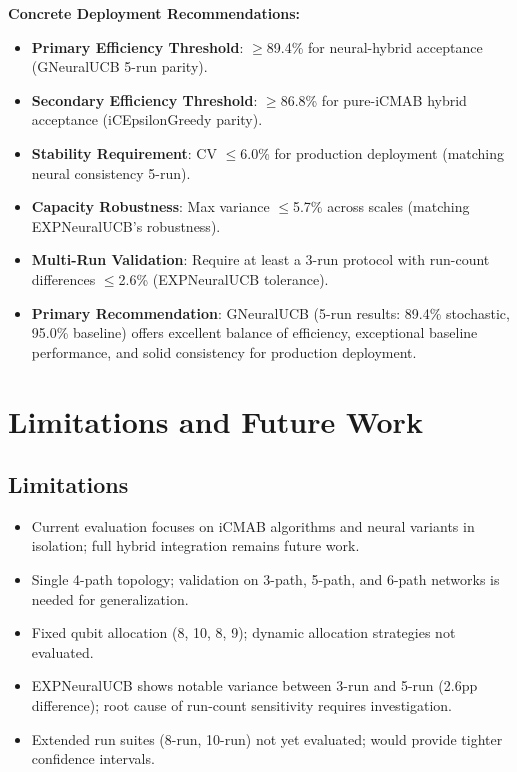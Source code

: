 \documentclass[12pt,a4paper]{article}
\begin{document}
\textbf{Concrete Deployment Recommendations:}
\begin{itemize}
\item \textbf{Primary Efficiency Threshold}: $\geq$89.4\% for neural-hybrid acceptance (GNeuralUCB 5-run parity).
\item \textbf{Secondary Efficiency Threshold}: $\geq$86.8\% for pure-iCMAB hybrid acceptance (iCEpsilonGreedy parity).
\item \textbf{Stability Requirement}: CV $\leq$6.0\% for production deployment (matching neural consistency 5-run).
\item \textbf{Capacity Robustness}: Max variance $\leq$5.7\% across scales (matching EXPNeuralUCB's robustness).
\item \textbf{Multi-Run Validation}: Require at least a 3-run protocol with run-count differences $\leq$2.6\% (EXPNeuralUCB tolerance).
\item \textbf{Primary Recommendation}: GNeuralUCB (5-run results: 89.4\% stochastic, 95.0\% baseline) offers excellent balance of efficiency, exceptional baseline performance, and solid consistency for production deployment.
\end{itemize}

\section{Limitations and Future Work}

\subsection{Limitations}
\begin{itemize}
\item Current evaluation focuses on iCMAB algorithms and neural variants in isolation; full hybrid integration remains future work.
\item Single 4-path topology; validation on 3-path, 5-path, and 6-path networks is needed for generalization.
\item Fixed qubit allocation (8, 10, 8, 9); dynamic allocation strategies not evaluated.
\item EXPNeuralUCB shows notable variance between 3-run and 5-run (2.6pp difference); root cause of run-count sensitivity requires investigation.
\item Extended run suites (8-run, 10-run) not yet evaluated; would provide tighter confidence intervals.
\end{itemize}
\end{document}
